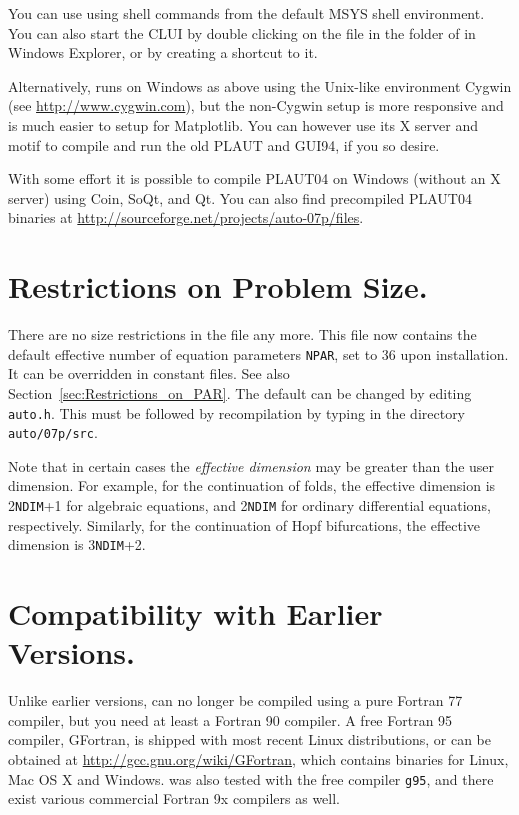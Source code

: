 \documentclass[12pt]{report}
\begin{document}
You can use \AUTO using shell commands from the default MSYS shell
environment. You can also start the CLUI by double clicking on the file
 in the  folder of \AUTO in Windows Explorer,
or by creating a shortcut to it.

Alternatively, \AUTO runs on Windows as above using the Unix-like
environment Cygwin (see \url{http://www.cygwin.com}), but the
non-Cygwin setup is more responsive and is much easier to setup for
Matplotlib. You can however use its X server and motif to compile
and run the old {\cal PLAUT} and GUI94, if you so desire.

With some effort it is possible to compile {\cal PLAUT04}
on Windows (without an X server) using Coin, SoQt, and Qt. You can
also find precompiled {\cal PLAUT04} binaries at
\url{http://sourceforge.net/projects/auto-07p/files}.

\section{ Restrictions on Problem Size.} \label{sec:Restrictions}
There are no size restrictions in the file  any more. This file now contains the
default effective number of equation parameters {\tt NPAR}, set to 36
upon installation. It can be overridden in constant files.
See also Section~\ref{sec:Restrictions_on_PAR}.
The default can be changed by editing {\tt auto.h}.
This must be followed by recompilation by typing  
in the directory {\tt auto/07p/src}.

Note that in certain cases the {\it effective dimension} may be greater
than the user dimension.
For example, for the continuation of folds,
the effective dimension is 2{\tt NDIM}+1 for algebraic equations,
and 2{\tt NDIM} for ordinary differential equations, respectively.
Similarly, for the continuation of Hopf bifurcations,
the effective dimension is 3{\tt NDIM}+2.
 
 
\section{ Compatibility with Earlier Versions.} \label{sec:Compatibility}
Unlike earlier versions, \AUTO can no longer be compiled using a pure
Fortran 77 compiler, but you need at least a Fortran 90 compiler.
A free Fortran 95 compiler, GFortran, is shipped with most recent
Linux distributions, or can be obtained at
\url{http://gcc.gnu.org/wiki/GFortran}, which contains binaries for
Linux, Mac OS X and Windows. \AUTO was also tested with the free
compiler {\tt g95}, and there exist various commercial Fortran
9x compilers as well.
\end{document}
